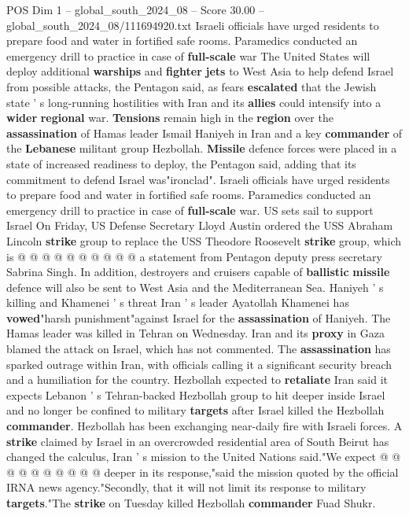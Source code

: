 \begin{textsample}{POS Dim 1 – global\_south\_2024\_08 – Score 30.00 – global\_south\_2024\_08/111694920.txt}  \label{ex:f1_pos_009}
Israeli officials have urged residents to prepare food and water in fortified safe rooms.
Paramedics conducted an emergency drill to practice in case of \textbf{full-scale} war The United States will deploy additional \textbf{warships} and \textbf{fighter} \textbf{jets} to West Asia to help defend Israel from possible attacks, the Pentagon said, as fears \textbf{escalated} that the Jewish state ' s long-running hostilities with Iran and its \textbf{allies} could intensify into a \textbf{wider} \textbf{regional} war. \textbf{Tensions} remain high in the \textbf{region} over the \textbf{assassination} of Hamas leader Ismail Haniyeh in Iran and a key \textbf{commander} of the \textbf{Lebanese} militant group Hezbollah. \textbf{Missile} defence forces were placed in a state of increased readiness to deploy, the Pentagon said, adding that its commitment to defend Israel was"ironclad".
Israeli officials have urged residents to prepare food and water in fortified safe rooms.
Paramedics conducted an emergency drill to practice in case of \textbf{full-scale} war.
US sets sail to support Israel On Friday, US Defense Secretary Lloyd Austin ordered the USS Abraham Lincoln \textbf{strike} group to replace the USS Theodore Roosevelt \textbf{strike} group, which is @ @ @ @ @ @ @ @ @ @ a statement from Pentagon deputy press secretary Sabrina Singh.
In addition, destroyers and cruisers capable of \textbf{ballistic} \textbf{missile} defence will also be sent to West Asia and the Mediterranean Sea.
Haniyeh ' s killing and Khamenei ' s threat Iran ' s leader Ayatollah Khamenei has \textbf{vowed}"harsh punishment"against Israel for the \textbf{assassination} of Haniyeh.
The Hamas leader was killed in Tehran on Wednesday.
Iran and its \textbf{proxy} in Gaza blamed the attack on Israel, which has not commented.
The \textbf{assassination} has sparked outrage within Iran, with officials calling it a significant security breach and a humiliation for the country.
Hezbollah expected to \textbf{retaliate} Iran said it expects Lebanon ' s Tehran-backed Hezbollah group to hit deeper inside Israel and no longer be confined to military \textbf{targets} after Israel killed the Hezbollah \textbf{commander}.
Hezbollah has been exchanging near-daily fire with Israeli forces.
A \textbf{strike} claimed by Israel in an overcrowded residential area of South Beirut has changed the calculus, Iran ' s mission to the United Nations said."We expect @ @ @ @ @ @ @ @ @ @ deeper in its response,"said the mission quoted by the official IRNA news agency."Secondly, that it will not limit its response to military \textbf{targets}."The \textbf{strike} on Tuesday killed Hezbollah \textbf{commander} Fuad Shukr.

\end{textsample}
